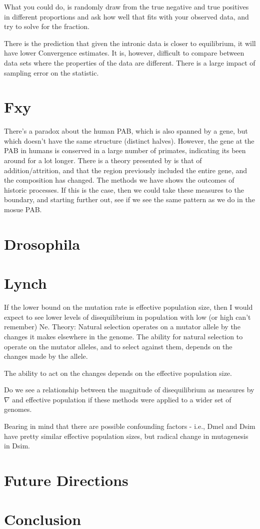 What you could do, is randomly draw from the true negative and true positives in different proportions and ask how well that fits with your observed data, and try to solve for the fraction. 

There is the prediction that given the intronic data is closer to equilibrium, it will have  lower Convergence estimates. It is, however, difficult to compare between data sets where the properties of the data are different. There is a large impact of sampling error on the statistic. 



\section{Fxy}
There's a paradox about the human PAB, which is also spanned by a gene, but which doesn't have the same structure (distinct halves). However, the gene at the PAB in humans is conserved in a large number of primates, indicating its been around for a lot longer. There is a theory presented by \cite{Galtier2004RecombinationParadox} is that of addition/attrition, and that the region previously included the entire gene, and the composition has changed. The methods we have shows the outcomes of historic processes. If this is the case, then we could take these measures to the boundary, and starting further out, see if we see the same pattern as we do in the mosue PAB. 



\section{Drosophila}

\section{Lynch}

If the lower bound on the mutation rate is effective population size, then I would expect to see lower levels of disequilibrium in population with low (or high can't remember) Ne. 
Theory: Natural selection operates on a mutator allele by the changes it makes elsewhere in the genome. 
The ability for natural selection to operate on the mutator alleles, and to select against them, depends on the changes made by the allele. 

The ability to act on the changes depends on the effective population size. 

Do we see a relationship between the magnitude of disequilibrium as measures by $\nabla$ and effective population if these methods were applied to a wider set of genomes. 

Bearing in mind that there are possible confounding factors - i.e., Dmel and Dsim have pretty similar effective population sizes, but radical change in mutagenesis in Dsim. 



\section{Future Directions}


\section{Conclusion}